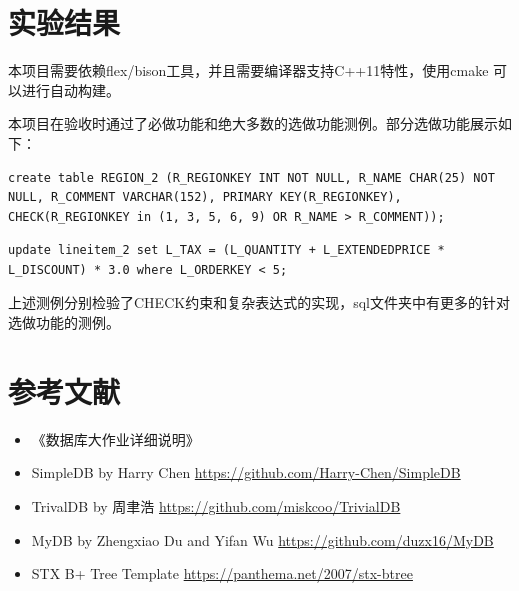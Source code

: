 \documentclass[11pt,UTF8]{report}
\begin{document}
	
	\section{实验结果}
	本项目需要依赖flex/bison工具，并且需要编译器支持C++11特性，使用cmake 可以进行自动构建。
	
	本项目在验收时通过了必做功能和绝大多数的选做功能测例。部分选做功能展示如下：
	\begin{lstlisting}[style=sql1]
		create table REGION_2 (R_REGIONKEY INT NOT NULL, R_NAME CHAR(25) NOT NULL, R_COMMENT VARCHAR(152), PRIMARY KEY(R_REGIONKEY), CHECK(R_REGIONKEY in (1, 3, 5, 6, 9) OR R_NAME > R_COMMENT));\end{lstlisting}
	\begin{lstlisting}[style=sql1]
		update lineitem_2 set L_TAX = (L_QUANTITY + L_EXTENDEDPRICE * L_DISCOUNT) * 3.0 where L_ORDERKEY < 5;\end{lstlisting}
	上述测例分别检验了CHECK约束和复杂表达式的实现，sql文件夹中有更多的针对选做功能的测例。
	
	\section{参考文献}
	\begin{itemize}
		\item 《数据库大作业详细说明》
		\item SimpleDB by Harry Chen \url{https://github.com/Harry-Chen/SimpleDB}
		\item TrivalDB by 周聿浩 \url{https://github.com/miskcoo/TrivialDB}
		\item MyDB by Zhengxiao Du and Yifan Wu \url{https://github.com/duzx16/MyDB}
		\item STX B+ Tree Template \url{https://panthema.net/2007/stx-btree}
	\end{itemize}
\end{document}
